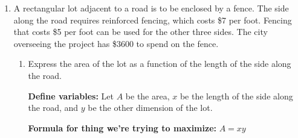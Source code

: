 \documentclass{article}
\begin{document}
\begin{enumerate}
\begin{enumerate}[resume]
  \item
    \begin{problem}[\nstretch{0.25}]
      Is this consistent with the Extreme Value Theorem? 
    \end{problem}

  \end{enumerate}

\item  \label{pasachoff-4.3.2} %

  A rectangular lot adjacent to a road is to be enclosed by a fence. The side along the road requires reinforced fencing, which costs \$7 per foot. Fencing that costs \$5 per foot can be used for the other three sides. The city overseeing the project has \$3600 to spend on the fence. 

  \begin{enumerate}
  \item
    \begin{problem}[\vfill]
      Express the area of the lot as a function of the length of the side along the road. 
    \end{problem}

    \begin{solution}
      {\textbf{Define variables:} Let $A$ be the area, $x$ be the
        length of the side along the road, and $y$ be the other dimension of
        the lot.}
      \begin{center}
      \end{center}

      {\textbf{Formula for thing we're trying to maximize:} $A =
        xy$} 


\end{solution}
\end{enumerate}
\end{enumerate}
\end{document}
